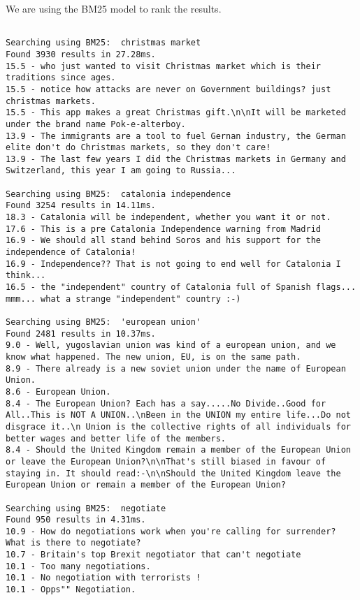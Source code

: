 \documentclass{scrartcl}
\begin{document}
We are using the BM25 model to rank the results.

\begin{lstlisting}

Searching using BM25:  christmas market
Found 3930 results in 27.28ms.
15.5 - who just wanted to visit Christmas market which is their traditions since ages.
15.5 - notice how attacks are never on Government buildings? just christmas markets.
15.5 - This app makes a great Christmas gift.\n\nIt will be marketed under the brand name Pok-e-alterboy.
13.9 - The immigrants are a tool to fuel Gernan industry, the German elite don't do Christmas markets, so they don't care!
13.9 - The last few years I did the Christmas markets in Germany and Switzerland, this year I am going to Russia...

Searching using BM25:  catalonia independence
Found 3254 results in 14.11ms.
18.3 - Catalonia will be independent, whether you want it or not.
17.6 - This is a pre Catalonia Independence warning from Madrid
16.9 - We should all stand behind Soros and his support for the independence of Catalonia!
16.9 - Independence?? That is not going to end well for Catalonia I think...
16.5 - the "independent" country of Catalonia full of Spanish flags... mmm... what a strange "independent" country :-)

Searching using BM25:  'european union'
Found 2481 results in 10.37ms.
9.0 - Well, yugoslavian union was kind of a european union, and we know what happened. The new union, EU, is on the same path.
8.9 - There already is a new soviet union under the name of European Union.
8.6 - European Union.
8.4 - The European Union? Each has a say.....No Divide..Good for All..This is NOT A UNION..\nBeen in the UNION my entire life...Do not disgrace it..\n Union is the collective rights of all individuals for better wages and better life of the members.
8.4 - Should the United Kingdom remain a member of the European Union or leave the European Union?\n\nThat's still biased in favour of staying in. It should read:-\n\nShould the United Kingdom leave the European Union or remain a member of the European Union?

Searching using BM25:  negotiate
Found 950 results in 4.31ms.
10.9 - How do negotiations work when you're calling for surrender? What is there to negotiate?
10.7 - Britain's top Brexit negotiator that can't negotiate
10.1 - Too many negotiations.
10.1 - No negotiation with terrorists !
10.1 - Opps"" Negotiation.

\end{lstlisting}
\end{document}
